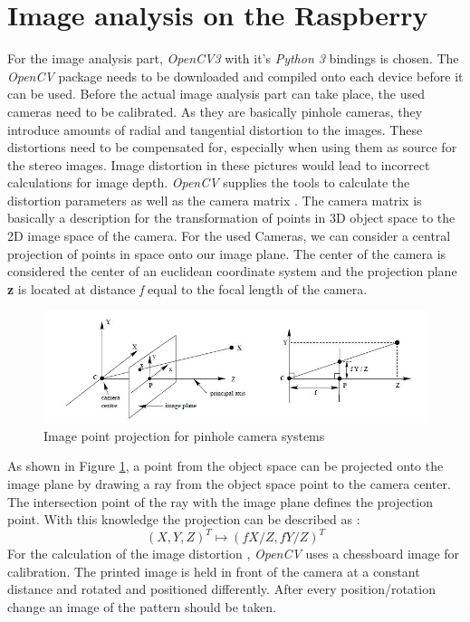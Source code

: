 \section{Image analysis on the Raspberry}
For the image analysis part, \textit{OpenCV3} with it's \textit{Python 3} bindings is chosen. The \textit{OpenCV} package needs to be downloaded and compiled onto each device before it can be used.
Before the actual image analysis part can take place, the used cameras need to be calibrated. As they are basically pinhole cameras, they introduce amounts of radial and tangential distortion to the images. These distortions need to be compensated for, especially when using them as source for the stereo images. Image distortion in these pictures would lead to incorrect calculations for image depth.
\textit{OpenCV} supplies the tools to calculate the distortion parameters as well as the camera matrix \cite{Opencv.2018}.
The camera matrix is basically a description for the transformation of points in 3D object space to the 2D image space of the camera. For the used Cameras, we can consider a central projection of points in space onto our image plane. The center of the camera is considered the center of an euclidean coordinate system and the projection plane \textbf{z} is located at distance \textit{f} equal to the focal length of the camera.
\begin{figure}[H]
\includegraphics[width=\textwidth]{images/pionhole.JPG}
\caption{Image point projection for pinhole camera systems\cite{Hartley.2000}}
\label{pinholecamera_mapping} 
\end{figure}
As shown in Figure \ref{pinholecamera_mapping}, a point from the object space can be projected onto the image plane by drawing a ray from the object space point to the camera center. The intersection point of the ray with the image plane defines the projection point. With this knowledge the projection can be described as :
\begin{equation}
(X,Y,Z)^{T} \mapsto (fX/Z,fY/Z)^{T}
\end{equation}
For the calculation of the image distortion , \textit{OpenCV} uses a chessboard image for calibration. The printed image is held in front of the camera at a constant distance and rotated and positioned differently. After every position/rotation change an image of the pattern should be taken.
